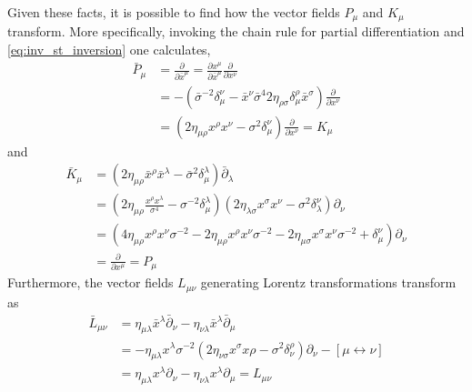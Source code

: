 \documentclass[10pt]{article}
\newcommand{\pd}{\partial}
\begin{document}
Given these facts, it is possible to find how the vector fields 
$P_\mu$ and $K_\mu$ transform. More specifically, invoking the 
chain rule for partial differentiation and 
\eqref{eq:inv_st_inversion} one calculates,
%
\begin{displaymath}
	\begin{split}
		\bar{P}_\mu &= \frac{\pd}{\pd\bar{x}^\mu}
		= \frac{\pd x^\mu}{\pd\bar{x}^\mu} \frac{\pd}{\pd x^\nu}\\
		&= -(\bar{\sigma}^{-2} \delta^\nu_\mu - \bar{x}^\nu
			\bar{\sigma}^4 2\eta_{\rho\sigma}\delta^\rho_\mu 
			\bar{x}^\sigma) \frac{\pd}{\pd x^\nu} \\
		&= (2\eta_{\mu\rho}x^\rho x^\nu - \sigma^2
			\delta^\nu_\mu) \frac{\pd}{\pd x^\nu}
		= K_\mu
	\end{split}
\end{displaymath}
and
\begin{displaymath}
	\begin{split}
		\bar{K}_\mu &= (2\eta_{\mu\rho} \bar{x}^\rho
			\bar{x}^\lambda - \bar{\sigma}^2 \delta^\lambda_\mu)
			\bar{\pd}_{\lambda} \\
		&= (2\eta_{\mu\rho}\frac{x^\rho x^\lambda}{\sigma^4}
			-\sigma^{-2}\delta^\lambda_\mu) (2\eta_{\lambda\sigma} 
			x^\sigma x^\nu -\sigma^2 \delta^\nu_\lambda) \pd_{\nu} \\
		&= (4\eta_{\mu\rho}x^\rho x^\nu \sigma^{-2}
			- 2\eta_{\mu\rho} x^\rho x^\nu \sigma^{-2} - 
			2\eta_{\mu\sigma} x^\sigma x^\nu \sigma^{-2} + 
			\delta^\nu_\mu) \pd_{\nu} \\
		&= \frac{\pd}{\pd x^\mu} = P_\mu
	\end{split}
\end{displaymath}
%
Furthermore, the vector fields $L_{\mu\nu}$ generating Lorentz 
transformations transform as
%
\begin{displaymath}
	\begin{split}
		\bar{L}_{\mu\nu} &= \eta_{\mu\lambda}\bar{x}^\lambda
			\bar{\pd}_\nu - \eta_{\nu\lambda}\bar{x}^\lambda 
			\bar{\pd}_\mu \\
		&= - \eta_{\mu\lambda}x^\lambda\sigma^{-2}
			(2\eta_{\nu\sigma}x^\sigma x\rho - \sigma^2 
			\delta^\rho_\nu) \pd_\nu - [\mu \leftrightarrow \nu] \\
		&= \eta_{\mu\lambda} x^\lambda \pd_\nu - \eta_{\nu\lambda}
			x^\lambda \pd_\mu = L_{\mu\nu}
	\end{split}
\end{displaymath}
\end{document}
